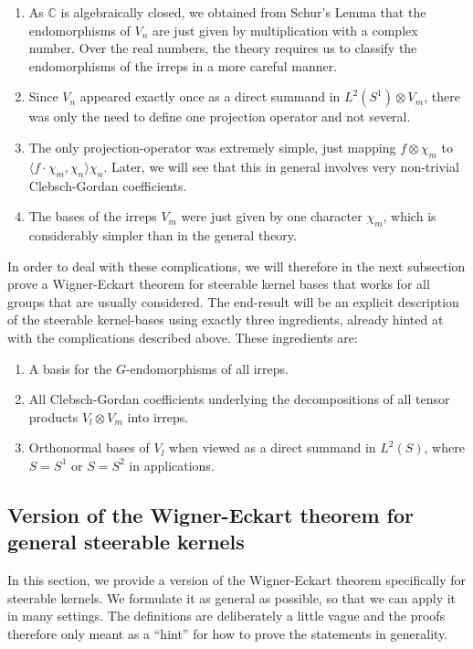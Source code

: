 \documentclass[12pt, a4paper]{article}
\theoremstyle{plain}
\theoremstyle{definition}
\theoremstyle{remark}
\newcommand{\C}{\mathds{C}}
\begin{document}
\begin{enumerate}
\item As $\C$ is algebraically closed, we obtained from Schur's Lemma that the endomorphisms of $V_n$ are just given by multiplication with a complex number. Over the real numbers, the theory requires us to classify the endomorphisms of the irreps in a more careful manner.
\item Since $V_n$ appeared exactly once as a direct summand in $L^2(S^1) \otimes V_m$, there was only the need to define one projection operator and not several.
\item The only projection-operator was extremely simple, just mapping $f \otimes \chi_m$ to $\langle f \cdot \chi_m, \chi_n \rangle \chi_n$. Later, we will see that this in general involves very non-trivial Clebsch-Gordan coefficients.
\item The bases of the irreps $V_m$ were just given by one character $\chi_m$, which is considerably simpler than in the general theory.
\end{enumerate}

In order to deal with these complications, we will therefore in the next subsection prove a Wigner-Eckart theorem for steerable kernel bases that works for all groups that are usually considered. The end-result will be an explicit description of the steerable kernel-bases using exactly three ingredients, already hinted at with the complications described above. These ingredients are:
\begin{enumerate}
\item A basis for the $G$-endomorphisms of all irreps.
\item All Clebsch-Gordan coefficients underlying the decompositions of all tensor products $V_l \otimes V_m$ into irreps.
\item Orthonormal bases of $V_l$ when viewed as a direct summand in $L^2(S)$, where $S = S^1$ or $S = S^2$ in applications.
\end{enumerate}

\subsection{Version of the Wigner-Eckart theorem for general steerable kernels}\label{general_wigner_eckart}

In this section, we provide a version of the Wigner-Eckart theorem specifically for steerable kernels. We formulate it as general as possible, so that we can apply it in many settings. The definitions are deliberately a little vague and the proofs therefore only meant as a ``hint'' for how to prove the statements in generality. 
\end{document}
